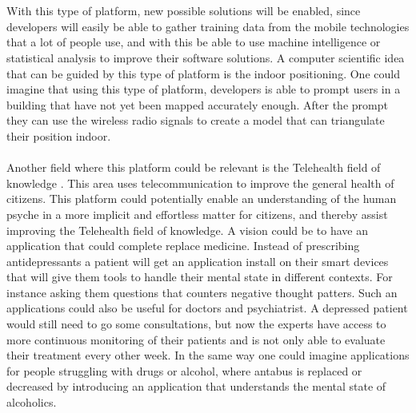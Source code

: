 \\\\
With this type of platform, new possible solutions will be enabled, since developers will easily be able to gather training data from the mobile technologies that a lot of people use, and with this be able to use machine intelligence or statistical analysis to improve their software solutions. A computer scientific idea that can be guided by this type of platform is the indoor positioning. One could imagine that using this type of platform, developers is able to prompt users in a building that have not yet been mapped accurately enough. After the prompt they can use the wireless radio signals to create a model that can triangulate their position indoor.
\\\\
Another field where this platform could be relevant is the Telehealth field of knowledge \parencite{telehealth_aau}. This area uses telecommunication to improve the general health of citizens. This platform could potentially enable an understanding of the human psyche in a more implicit and effortless matter for citizens, and thereby assist improving the Telehealth field of knowledge. A vision could be to have an application that could complete replace medicine. Instead of prescribing antidepressants a patient will get an application install on their smart devices that will give them tools to handle their mental state in different contexts. For instance asking them questions that counters negative thought patters. Such an applications could also be useful for doctors and psychiatrist. A depressed patient would still need to go some consultations, but now the experts have access to more continuous monitoring of their patients and is not only able to evaluate their treatment every other week. In the same way one could imagine applications for people struggling with drugs or alcohol, where antabus is replaced or decreased by introducing an application that understands the mental state of alcoholics.

